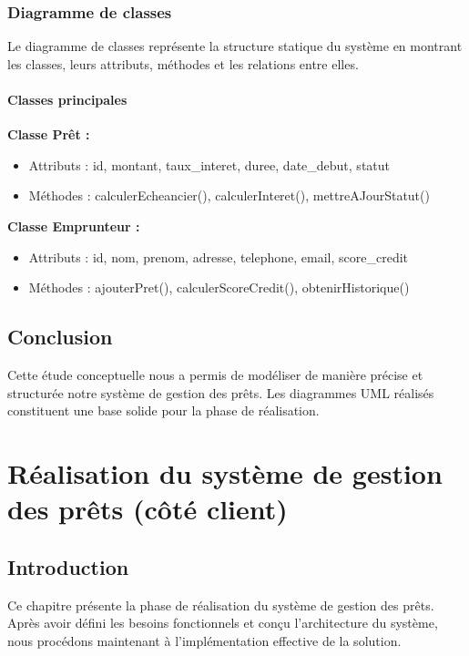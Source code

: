 \documentclass[12pt,a4paper]{report}
\begin{document}
\subsection{Diagramme de classes}

Le diagramme de classes représente la structure statique du système en montrant les classes, leurs attributs, méthodes et les relations entre elles.

\subsubsection{Classes principales}

\textbf{Classe Prêt :}
\begin{itemize}
    \item Attributs : id, montant, taux\_interet, duree, date\_debut, statut
    \item Méthodes : calculerEcheancier(), calculerInteret(), mettreAJourStatut()
\end{itemize}

\textbf{Classe Emprunteur :}
\begin{itemize}
    \item Attributs : id, nom, prenom, adresse, telephone, email, score\_credit
    \item Méthodes : ajouterPret(), calculerScoreCredit(), obtenirHistorique()
\end{itemize}

\section{Conclusion}

Cette étude conceptuelle nous a permis de modéliser de manière précise et structurée notre système de gestion des prêts. Les diagrammes UML réalisés constituent une base solide pour la phase de réalisation.

\newpage

\chapter{Réalisation du système de gestion des prêts (côté client)}

\section{Introduction}

Ce chapitre présente la phase de réalisation du système de gestion des prêts. Après avoir défini les besoins fonctionnels et conçu l'architecture du système, nous procédons maintenant à l'implémentation effective de la solution.
\end{document}

